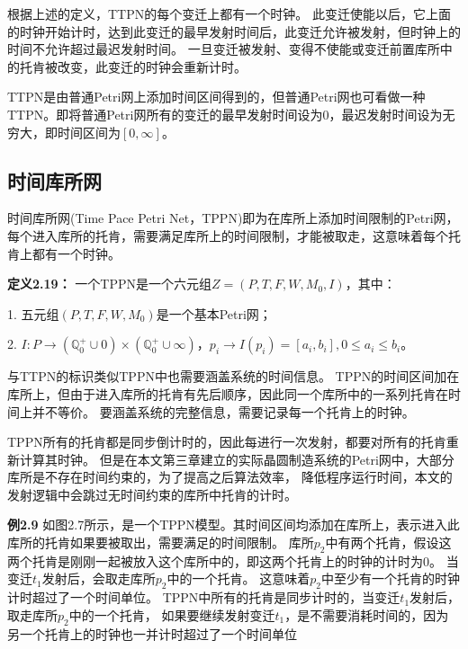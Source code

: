     根据上述的定义，TTPN的每个变迁上都有一个时钟。
    此变迁使能以后，它上面的时钟开始计时，达到此变迁的最早发射时间后，此变迁允许被发射，但时钟上的时间不允许超过最迟发射时间。
    一旦变迁被发射、变得不使能或变迁前置库所中的托肯被改变，此变迁的时钟会重新计时。

    TTPN是由普通Petri网上添加时间区间得到的，但普通Petri网也可看做一种TTPN。即将普通Petri网所有的变迁的最早发射时间设为0，最迟发射时间设为无穷大，即时间区间为$[0,\infty]$。
    \subsection{时间库所网}
    时间库所网(Time Pace Petri Net，TPPN)即为在库所上添加时间限制的Petri网，每个进入库所的托肯，需要满足库所上的时间限制，才能被取走，这意味着每个托肯上都有一个时钟。

    \textbf{定义2.19}\cite{St2008Real}\cite{2012Reachability}\cite{Bonhomme2014Marking}\textbf{：}
    一个TPPN是一个六元组$Z=(P,T,F,W,M_{0},I)$，其中：

    1. 五元组$(P,T,F,W,M_{0})$是一个基本Petri网；

    2. $I:P \rightarrow (\mathbb{Q}_{0}^{+} \cup 0) \times (\mathbb{Q}_{0}^{+} \cup {\infty})$，$p_{i} \rightarrow I(p_{i})=[a_{i},b_{i}], 0 \leq a_{i} \leq b_{i} $。

    与TTPN的标识类似TPPN中也需要涵盖系统的时间信息。
    TPPN的时间区间加在库所上，但由于进入库所的托肯有先后顺序，因此同一个库所中的一系列托肯在时间上并不等价。
    要涵盖系统的完整信息，需要记录每一个托肯上的时钟。

    TPPN所有的托肯都是同步倒计时的，因此每进行一次发射，都要对所有的托肯重新计算其时钟。
    但是在本文第三章建立的实际晶圆制造系统的Petri网中，大部分库所是不存在时间约束的，为了提高之后算法效率，
    降低程序运行时间，本文的发射逻辑中会跳过无时间约束的库所中托肯的计时。

    \textbf{例2.9}\hspace{0.5em}
    如图2.7所示，是一个TPPN模型。其时间区间均添加在库所上，表示进入此库所的托肯如果要被取出，需要满足的时间限制。
    库所$p_{2}$中有两个托肯，假设这两个托肯是刚刚一起被放入这个库所中的，即这两个托肯上的时钟的计时为0。
    当变迁$t_{1}$发射后，会取走库所$p_{2}$中的一个托肯。
    这意味着$p_{2}$中至少有一个托肯的时钟计时超过了一个时间单位。
    TPPN中所有的托肯是同步计时的，当变迁$t_{1}$发射后，取走库所$p_{2}$中的一个托肯，
    如果要继续发射变迁$t_{1}$，是不需要消耗时间的，因为另一个托肯上的时钟也一并计时超过了一个时间单位

